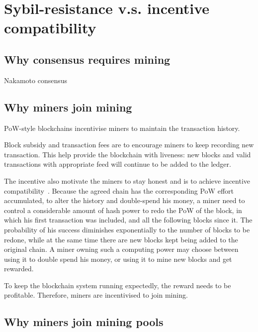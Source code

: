 \section{Sybil-resistance v.s. incentive compatibility}

\subsection{Why consensus requires mining}

Nakamoto consensus


\subsection{Why miners join mining}

PoW-style blockchains incentivise miners to maintain the transaction history.

Block subsidy and transaction fees are to encourage miners to keep recording new transaction.
This help provide the blockchain with liveness: new blocks and valid transactions with appropriate feed will continue to be added to the ledger.

The incentive also motivate the miners to stay honest and is to achieve incentive compatibility~\cite{}.
Because the agreed chain has the corresponding PoW effort accumulated, to alter the history and double-spend his money, a miner need to control a considerable amount of hash power to redo the PoW of the block, in which his first transaction was included, and all the following blocks since it.
The probability of his success diminishes exponentially to the number of blocks to be redone, while at the same time there are new blocks kept being added to the original chain. 
A miner owning such a computing power may choose between using it to double spend his money, or using it to mine new blocks and get rewarded. 

To keep the blockchain system running expectedly, the reward needs to be profitable.
Therefore, miners are incentivised to join mining.

\subsection{Why miners join mining pools}



